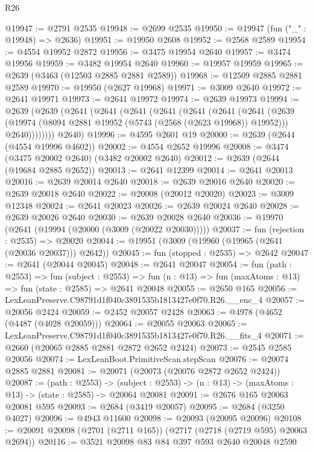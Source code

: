 \begin{lexlean}{R26}
\begin{coremodule}
@19947 := @2791 @2535
@19948 := @2699 @2535
@19950 := @19947 (fun ("_" : @19948) => @2636)
@19951 := @19950 @2608
@19952 := @2568 @2589
@19954 := @4554 @19952 @2872
@19956 := @3475 @19954 @2640
@19957 := @3474 @19956
@19959 := @3482 @19954 @2640
@19960 := @19957 @19959
@19965 := @2639 (@3463 (@12503 @2885 @2881 @2589))
@19968 := @12509 @2885 @2881 @2589
@19970 := @19950 (@2627 @19968)
@19971 := @3009 @2640
@19972 := @2641 @19971
@19973 := @2641 @19972
@19974 := @2639 @19973
@19994 := @2639
    (@2639
      (@2641
        (@2641
          (@2641
            (@2641
              (@2641
                (@2641
                  (@2641
                    (@2639
                      (@19974 (@8094 @2881 @19952 (@5743 (@2568 (@2623 @19968)) @19952)))
                      @2640))))))))
      @2640)
@19996 := @4595 @2601 @19
@20000 := @2639 (@2644 (@4554 @19996 @4602))
@20002 := @4554 @2652 @19996
@20008 := @3474 (@3475 @20002 @2640) (@3482 @20002 @2640)
@20012 := @2639 (@2644 (@19684 @2885 @2652))
@20013 := @2641 @12399
@20014 := @2641 @20013
@20016 := @2639 @20014 @2640
@20018 := @2639 @20016 @2640
@20020 := @2639 @20018 @2640
@20022 := @20008 (@20012 @20020)
@20023 := @3009 @12348
@20024 := @2641 @20023
@20026 := @2639 @20024 @2640
@20028 := @2639 @20026 @2640
@20030 := @2639 @20028 @2640
@20036 := @19970 (@2641 (@19994 (@20000 (@3009 (@20022 @20030)))))
@20037 := fun (rejection : @2535) => @20020
@20044 := @19951 (@3009 (@19960 (@19965 (@2641 (@20036 @20037))) @2642))
@20045 := fun (stopped : @2535) => @2642
@20047 := @2641 (@20044 @20045)
@20048 := @2641 @20047
@20054 := fun (path : @2553) =>
  fun (subject : @2553) =>
  fun (n : @13) => fun (maxAtoms : @13) => fun (state : @2585) => @2641 @20048
@20055 := @2650 @165
@20056 := LexLeanPreserve.C98791d1f040c3891535b1813427e0f70.R26.__enc_4
@20057 := @20056 @2424
@20059 := @2452 @20057 @2428
@20063 := @4978 (@4652 (@4487 (@4028 @20059)))
@20064 := @20055 @20063
@20065 := LexLeanPreserve.C98791d1f040c3891535b1813427e0f70.R26.__fits_4
@20071 := @2660 (@20065 @2885 @2881 @2872 @2652 @2424)
@20073 := @2545 @2585 @20056
@20074 := LexLeanBoot.PrimitiveScan.stepScan
@20076 := @20074 @2885 @2881
@20081 := @20071 (@20073 (@20076 @2872 @2652 @2424))
@20087 := (path : @2553) ->
  (subject : @2553) -> (n : @13) -> (maxAtoms : @13) -> (state : @2585) -> @20064 @20081
@20091 := @2676 @165 @20063 @20081 @595
@20093 := @2684 (@3419 @20057)
@20095 := @2684 (@3250 @4027)
@20096 := @4943 @11600
@20098 := @20093 (@20095 @20096)
@20108 := @20091 @20098 (@2701 (@2711 @165)) (@2717 (@2718 (@2719 @595) @20063 @2694))
@20116 := @3521 @20098 @83 @84 @397 @593 @2640 @20048 @2590

\end{coremodule}
\end{lexlean}
